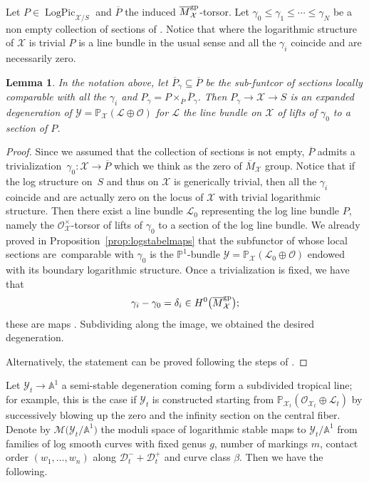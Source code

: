 \documentclass[pdftex]{sigma}
\newcommand{\D}{\mathcal{D}}
\renewcommand{\L}{\mathcal{L}}
\newcommand{\M}{\mathcal{M}}
\newcommand{\X}{\mathcal{X}}
\renewcommand{\O}{\mathcal{O}}
\newcommand{\Y}{\mathcal{Y}}
\renewcommand{\leq}{\leqslant}
\renewcommand{\bar}{\overline}
\numberwithin{equation}{section}
\newtheorem{lem}[theo]{Lemma}
\theoremstyle{definition}
\begin{document}
Let $P\in\operatorname{LogPic}_{\X\slash S}$ and
$\bar{P}$ the induced $\bar{M}^{\rm gp}_{\mathcal{X}}$-torsor. Let $\gamma_0\leq\gamma_1\leq\cdots\leq\gamma_N$ be a non empty collection of sections of \smash{$\bar{P}$}. Notice that where the logarithmic structure of $\X$ is trivial $P$ is a line bundle in the usual sense and all the $\gamma_i$ coincide and are necessarily zero.
\begin{lem}\label{lem:tropicaline}
In the notation above, let $\bar{P}_{\gamma}\subseteq \bar{P}$ be the sub-funtcor of sections locally comparable with all the $\gamma_i$ and $P_{\gamma}=P\times_{\bar{P}}\bar{P}_{\gamma}$. Then $P_{\gamma}\to\X\to S$ is an expanded degeneration of $\Y=\mathbb P_{\X}(\L\oplus\O)$ for $\L$ the line bundle on $\X$ of lifts of $\gamma_0$ to a section of $P$.
\end{lem}
\begin{proof}
Since we assumed that the collection of sections is not empty, $\bar{P}$ admits a trivialization~${\gamma_0\colon\X\to\bar{P}}$ which we think as the zero of $\bar{M}_{\X}$ group. Notice that if the log structure on~$S$ and thus on $\X$ is generically trivial, then all the $\gamma_i$ coincide and are actually zero on the locus of $\X$ with trivial logarithmic structure. Then there exist a line bundle $\L_0$ representing the log line bundle $P$, namely the $\O_{\X}^\times$-torsor of lifts of $\gamma_0$ to a section of the log line bundle. We already proved in Proposition~\ref{prop:logstabelmaps} that the subfunctor of \smash{$P=L_0^\times\otimes_{\O_{\X}^\times}M_{\X}^{\rm gp}$} whose local sections are~comparable with $\gamma_0$ is the $\mathbb{P}^1$-bundle $\Y=\mathbb P_{\X}(\L_0\oplus\O)$ endowed with its boundary logarithmic structure.
Once a trivialization is fixed, we have that
\[
\gamma_i-\gamma_0=\delta_i\in H^0\bigl(\bar{M}_{\X}^{\rm gp}\bigr);
\] these are maps \smash{$\operatorname{Trop}(\X)=\operatorname{Trop}(S)\xrightarrow{\delta_i}\operatorname{Trop}(\Y)$}. Subdividing along the image, we obtained the desired degeneration.

 Alternatively, the statement can be proved following the steps of \cite[Proposition~5.2.4]{marcuswiselog}.
\end{proof}

Let $\mathcal Y_t\to\mathbb A^1$ a semi-stable degeneration coming form a subdivided tropical line; for example, this is the case if $\Y_t$ is constructed starting from $\mathbb P_{\X_t}(\O_{\X_t}\oplus\L_t)$ by successively blowing up the zero and the infinity section on the central fiber.
Denote by $\M\bigl(\Y_t\slash\mathbb A^1\bigr)$ the moduli space of logarithmic stable maps to $\Y_t\slash\mathbb A^1$ from families of log smooth curves with fixed genus $g$, number of markings $m$, contact order $(w_1,\dots, w_n)$ along $\D_t^-+\D_t^+$ and curve class $\beta$. Then we have the following.
\end{document}
